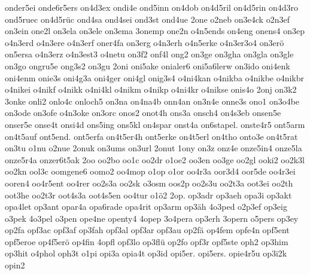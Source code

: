 {    onder5ei
    onde6r5ers
    on4d3ex
    ondi4e
    ond5inn
    on4dob
    on4d5ril
    on4d5rin
    on4d3ro
    ond5ruec
    on4d5rüc
    ond4sa
    ond4sei
    ond3st
    ond4ue
    2one
    o2neb
    on3e4ck
    o2n3ef
    on3ein
    one2l
    on3ela
    on3ele
    on3ema
    3onemp
    one2n
    o4n5ends
    on4eng
    onens4
    on3ep
    o4n3erd
    o4n3ere
    o4n3erf
    oner4fa
    on3erg
    o4n3erh
    o4n5erke
    o4n3er3o4
    on3erö
    on5ersa
    o4n3erz
    o4n3est3
    o4netu
    on3f2
    onf4l
    ong2
    on3ge
    on3gha
    on3gla
    on3gle
    on3go
    ongru5e
    ong3s2
    on3gu
    2oni
    oni5ake
    onialer6
    oni5a6lerw
    on3ido
    oni4enk
    oni4enm
    onie3s
    oni4g3a
    oni4ger
    oni4gl
    onig3s4
    o4ni4kan
    o4nikba
    o4nikbe
    o4nikbr
    o4nikei
    o4nikf
    o4nikk
    o4ni4kl
    o4nikm
    o4nikp
    o4ni4kr
    o4nikse
    onis4o
    2onj
    on3k2
    3onke
    onli2
    onlo4c
    onloch5
    on3na
    on4na4b
    onn4an
    on3n4e
    onne3s
    ono1
    on3o4be
    on3ode
    on3ofe
    o4n3oke
    on3orc
    onos2
    onot4h
    ons3a
    onsch4
    on4s3eb
    onsen5e
    onser5e
    onse4t
    onsi4d
    ons5ing
    ons5kl
    on4spar
    onst4a
    on6stapel.
    onste4r5
    ont5arm
    on4t5auf
    ont5end.
    ont5erfa
    on4t5er4h
    ont5erke
    on4t5erl
    on4tho
    onto3e
    on4t5rat
    on3tu
    o1nu
    o2nue
    2onuk
    on3ums
    on3url
    2onut
    1ony
    on3z
    onz4e
    onze5in4
    onze5la
    onze5r4a
    onzer6t5ak
    2oo
    oo2bo
    oo1c
    oo2dr
    o1oe2
    oo3en
    oo3ge
    oo2gl
    ooki2
    oo2k3l
    oo2kn
    ool3c
    oomgene6
    oomo2
    oo4mop
    o1op
    o1or
    oo4r3a
    oor3d4
    oor5de
    oo4r3ei
    ooren4
    oo4r5ent
    oo4rer
    oo2s3a
    oo2sk
    o3osm
    oos2p
    oo2s3u
    oo2t3a
    oot3ei
    oo2th
    oot3he
    oo2t3r
    oot4s3a
    oot4s5en
    oo4tur
    o1ö2
    2op.
    op3adr
    op3aeh
    opa3i
    op3akt
    opa4let
    op3ant
    opar4a
    opa6rade
    opa4rit
    op3arm
    op3äh
    4o3ped
    o2p3ef
    op3eig
    o3pek
    4o3pel
    o3pen
    ope4ne
    openty4
    4opep
    3o4pera
    op3erh
    3opern
    o5pers
    op3ey
    op2fa
    opf3ac
    opf3af
    op3fah
    opf3al
    opf3ar
    opf3au
    op2fä
    op4fem
    opfe4n
    opf5ent
    opf5eroe
    op4f5erö
    op4fin
    4opfl
    opf3lo
    op3flü
    op2fo
    opf3r
    opf5ste
    oph2
    op3him
    op3hit
    o4phol
    oph3t
    o1pi
    opi3a
    opia4t
    op3id
    opi5er.
    opi5ers.
    opie4r5u
    op3i2k
    opin2
}
